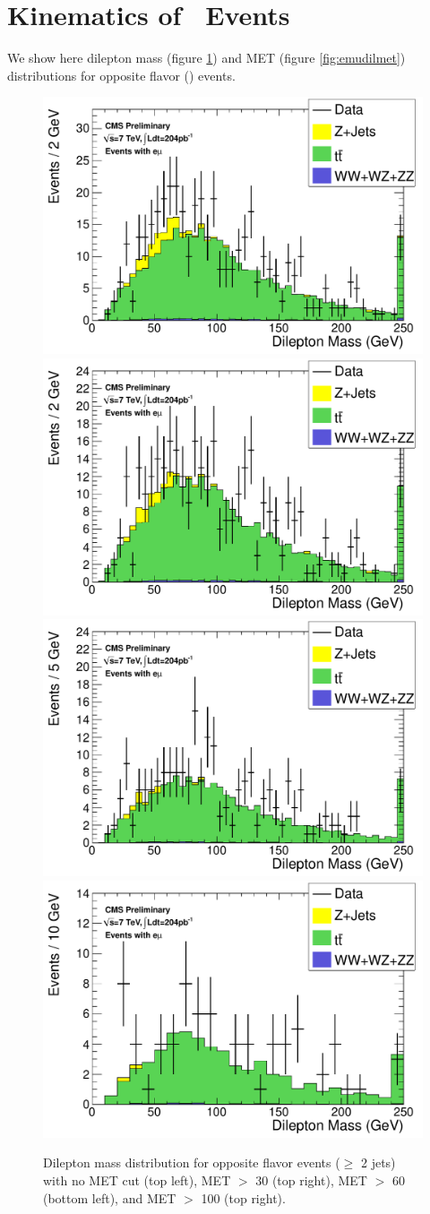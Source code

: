 \section{Kinematics of \emu ~Events}
\label{app:emu}

We show here dilepton mass (figure \ref{fig:emudilmass}) and MET (figure \ref{fig:emudilmet}) distributions for opposite flavor (\emu) events.

\begin{figure}[hbt]
  \begin{center}
	\includegraphics[width=0.48\linewidth]{plots/hdilmass_em_allj.pdf}
	\includegraphics[width=0.48\linewidth]{plots/hdilmass_pfmet30_em_allj.pdf}
	\includegraphics[width=0.48\linewidth]{plots/hdilmass_pfmet60_em_allj.pdf}
	\includegraphics[width=0.48\linewidth]{plots/hdilmass_pfmet100_em_allj.pdf}
	\caption{
	  \label{fig:emudilmass}\protect 
	  Dilepton mass distribution for opposite flavor events ($\ge$ 2 jets)
	  with no MET cut (top left),
	  MET $>$ 30 (top right),
	  MET $>$ 60 (bottom left), and
	  MET $>$ 100 (top right).
	}
  \end{center}
\end{figure}


